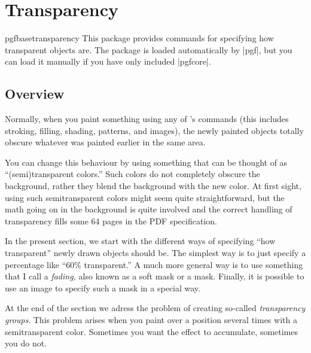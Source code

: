 %
%
%


\section{Transparency}

\label{section-transparency}


\begin{package}{pgfbasetransparency}
  This package provides commands for specifying how transparent
  objects are. The package is loaded automatically by 
  |pgf|, but you can load it manually if you have only included
  |pgfcore|.   
\end{package}


\subsection{Overview}

Normally, when you paint something using any of \pgfname's commands
(this includes stroking, filling, shading, patterns, and images), the
newly painted objects totally obscure whatever was painted earlier in
the same area.

You can change this behaviour by using something that can be thought
of as ``(semi)transparent colors.'' Such colors do not completely
obscure the background, rather they blend the background with the new
color. At first sight, using such semitransparent colors might seem quite
straightforward, but the math going on in the background is quite
involved and the correct handling of transparency fills some 64 pages
in the PDF specification. 

In the present section, we start with the different ways of specifying
``how transparent'' newly drawn objects should be. The simplest way is
to just specify a percentage like ``60\% transparent.'' A much more
general way is to use something that I call a \emph{fading,} also
known as a soft mask or a mask. Finally, it is possible to use an
image to specify such a mask in a special way.

At the end of the section we adress the problem of creating so-called
\emph{transparency groups}. This problem arises when you paint over a
position several times with a semitransparent color. Sometimes you
want the effect to accumulate, sometimes you do not.


